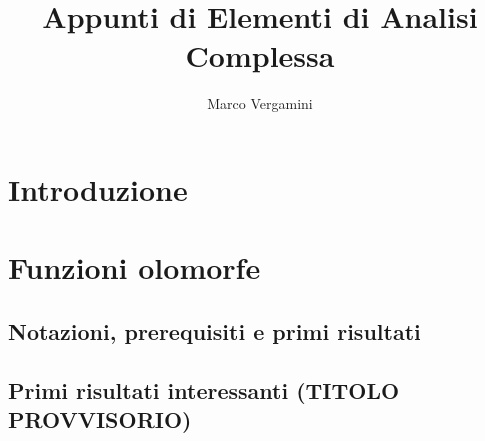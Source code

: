 \documentclass{article}
\title{Appunti di Elementi di Analisi Complessa}
\date{}
\author{Marco Vergamini}
\begin{document}
\maketitle
\newpage
\tableofcontents
\newpage


\section{Introduzione}


\newpage

\section{Funzioni olomorfe}

\subsection{Notazioni, prerequisiti e primi risultati}


\subsection{Primi risultati interessanti (TITOLO PROVVISORIO)}

\end{document}
